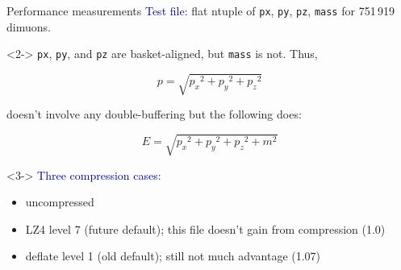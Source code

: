 \documentclass{beamer}
\begin{document}
\begin{frame}{Performance measurements}
\vspace{0.5 cm}
\textcolor{darkblue}{Test file:} flat ntuple of {\tt px}, {\tt py}, {\tt pz}, {\tt mass} for 751\,919 dimuons.

\vspace{0.5 cm}
\begin{uncoverenv}<2->
{\tt px}, {\tt py}, and {\tt pz} are basket-aligned, but {\tt mass} is not. Thus,

\[ p = \sqrt{{p_x}^2 + {p_y}^2 + {p_z}^2} \]

doesn't involve any double-buffering but the following does:

\[ E = \sqrt{{p_x}^2 + {p_y}^2 + {p_z}^2 + m^2} \]
\end{uncoverenv}

\vspace{0.25 cm}
\begin{uncoverenv}<3->
\textcolor{darkblue}{Three compression cases:}
\begin{itemize}
\item uncompressed
\item LZ4 level 7 (future default); this file doesn't gain from compression (1.0)
\item deflate level 1 (old default); still not much advantage (1.07)
\end{itemize}
\end{uncoverenv}
\end{frame}
\end{document}
